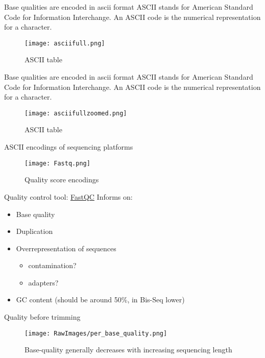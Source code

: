 \documentclass[presentation]{beamer}
\begin{document}
\begin{frame}[label=sec-2-1-7]{Base qualities are encoded in ascii format}
ASCII stands for American Standard Code for Information
Interchange. An ASCII code is the numerical representation for a
character.
\begin{figure}[htb]
\centering
\texttt{[image: asciifull.png]}
\caption{ASCII table}
\end{figure}
\end{frame}




\begin{frame}[label=sec-2-1-8]{Base qualities are encoded in ascii format}
ASCII stands for American Standard Code for Information
Interchange. An ASCII code is the numerical representation for a
character.
\begin{figure}[htb]
\centering
\texttt{[image: asciifullzoomed.png]}
\caption{ASCII table}
\end{figure}
\end{frame}



\begin{frame}[label=sec-2-1-9]{ASCII encodings of sequencing platforms}
\begin{figure}[htb]
\centering
\texttt{[image: Fastq.png]}
\caption{Quality score encodings}
\end{figure}
\end{frame}








\begin{frame}[label=sec-2-1-10]{Quality control tool: \href{http://www.bioinformatics.babraham.ac.uk/projects/fastqc/}{FastQC}}
Informs on:
\begin{itemize}
\item Base quality
\item Duplication
\item Overrepresentation of sequences
\begin{itemize}
\item contamination?
\item adapters?
\end{itemize}
\item GC content (should be around 50\%, in Bis-Seq lower)
\end{itemize}
\end{frame}


\begin{frame}[label=sec-2-1-11]{Quality before trimming}
\begin{figure}[htb]
\centering
\texttt{[image: RawImages/per\_base\_quality.png]}
\caption{Base-quality generally decreases with increasing sequencing length}
\end{figure}
\end{frame}
\end{document}

